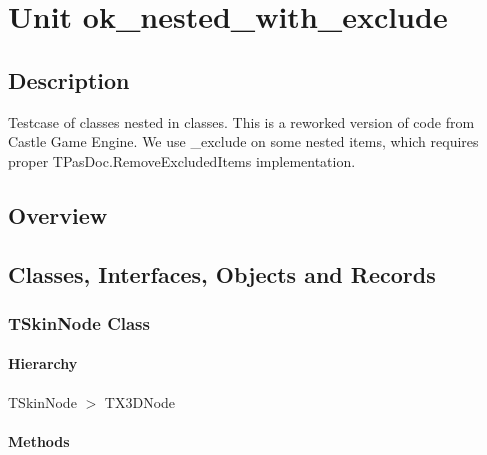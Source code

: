 \documentclass{report}
\newif\ifpdf
\begin{document}
\label{toc}\tableofcontents
\newpage
\newlength{\tmplength}
\chapter{Unit ok{\_}nested{\_}with{\_}exclude}
\label{ok_nested_with_exclude}
\section{Description}
Testcase of classes nested in classes. This is a reworked version of code from Castle Game Engine. We use {\_}exclude on some nested items, which requires proper TPasDoc.RemoveExcludedItems implementation.
\section{Overview}
\begin{description}
\item[\texttt{\begin{ttfamily}TSkinNode\end{ttfamily} Class}]
\end{description}
\section{Classes, Interfaces, Objects and Records}
\ifpdf
\subsection*{\large{\textbf{TSkinNode Class}}\normalsize\hspace{1ex}\hrulefill}
\else
\subsection*{TSkinNode Class}
\fi
\label{ok_nested_with_exclude.TSkinNode}
\subsubsection*{\large{\textbf{Hierarchy}}\normalsize\hspace{1ex}\hfill}
TSkinNode {$>$} TX3DNode
\subsubsection*{\large{\textbf{Methods}}\normalsize\hspace{1ex}\hfill}
\end{document}
